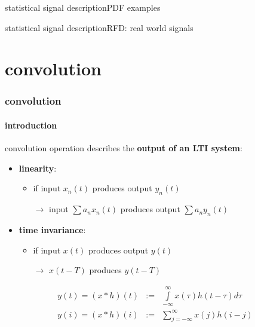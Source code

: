             \begin{frame}{statistical signal description}{PDF examples}
                \pause
            \end{frame}
                
            \begin{frame}{statistical signal description}{RFD: real world signals}
            \end{frame}	
 
    \section{convolution}
	\begin{frame}\frametitle{convolution}\framesubtitle{introduction}
        convolution operation describes the \textbf{output of an LTI system}:
        \pause
        \begin{itemize}
            \item   \textbf{linearity}: 
                \begin{itemize}
                    \item if input $x_n(t)$ produces output $y_n(t)$
                    \item[$\rightarrow$] input $\sum a_n x_n(t)$ produces output $\sum a_n y_n(t)$
                \end{itemize}
            \item   \textbf{time invariance}:
                \begin{itemize}
                    \item   if input $x(t)$ produces output $y(t)$
                    \item[$\rightarrow$] $x(t-T)$ produces $y(t-T)$
                \end{itemize}
        \end{itemize}
        \pause
        \begin{eqnarray*}
            y(t) = (x \ast h)(t) &:=& \int\limits_{-\infty}^{\infty}x(\tau)h(t-\tau)d\tau\\
            y(i) = (x \ast h)(i) &:=& \sum\limits_{j=-\infty}^{\infty}x(j)h(i-j)
        \end{eqnarray*}
	\end{frame}
        
